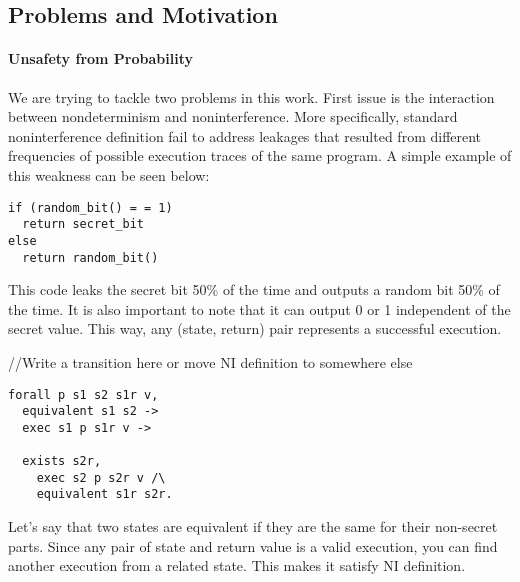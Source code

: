 \subsection*{Problems and Motivation}
\paragraph{Unsafety from Probability}
We are trying to tackle two problems in this work. First issue is the interaction between nondeterminism and noninterference. More specifically, standard noninterference definition fail to address leakages that resulted from different frequencies of possible execution traces of the same program. A simple example of this weakness can be seen below: 


\begin{lstlisting}
if (random_bit() = = 1)
  return secret_bit
else
  return random_bit()
\end{lstlisting}

This code leaks the secret bit 50\% of the time and outputs a random bit 50\% of the time. It is also important to note that it can output 0 or 1 independent of the secret value. This way, any (state, return) pair represents a successful execution. 

//Write a transition here or move NI definition to somewhere else


\begin{lstlisting}
forall p s1 s2 s1r v,
  equivalent s1 s2 ->
  exec s1 p s1r v ->
	
  exists s2r,
    exec s2 p s2r v /\
    equivalent s1r s2r.
\end{lstlisting} 

Let's say that two states are equivalent if they are the same for their non-secret parts. Since any pair of state and return value is a valid execution, you can find another execution from a related state. This makes it satisfy NI definition.

